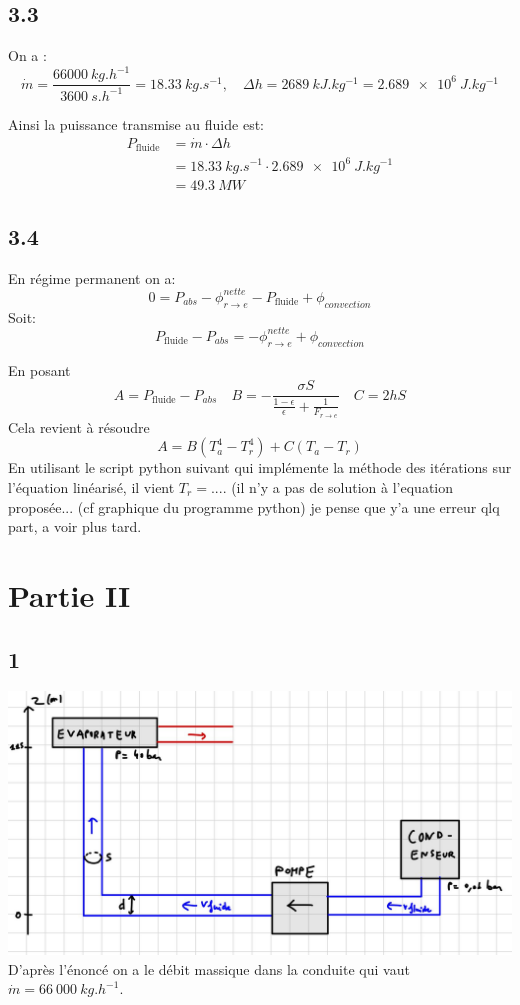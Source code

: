 \documentclass[12pt]{article}
\begin{document}
\subsection*{3.3}
On a :
\[
\dot{m} = \frac{\SI{66000}{kg.h^{-1}}}{\SI{3600}{s.h^{-1}}} = \SI{18.33}{kg.s^{-1}}, \quad
\Delta h = \SI{2689}{kJ.kg^{-1}} = \SI{2.689e6}{J.kg^{-1}}
\]

Ainsi la puissance transmise au fluide est:
\begin{align*}
P_{\text{fluide}} &= \dot{m} \cdot \Delta h \\ &= \SI{18.33}{kg.s^{-1}} \cdot \SI{2.689e6}{J.kg^{-1}} \\ &= \boxed{\SI{49.3}{MW}}
\end{align*}

\subsection*{3.4}
En régime permanent on a:
\[
0 = P_{abs} - \phi^{nette}_{r \rightarrow e} - P_{\text{fluide}} + \phi_{convection}
\]
Soit:
\[
P_{\text{fluide}} - P_{abs}  = -\phi^{nette}_{r \rightarrow e} + \phi_{convection}
\]

En posant
\[
A = P_{\text{fluide}} - P_{abs} \quad B = -\frac{\sigma S}{\frac{1-\epsilon}{\epsilon} + \frac{1}{F_{r \rightarrow e}}} \quad C = 2hS
\]
Cela revient à résoudre
\[
A = B(T_a^4 - T_r^4) + C(T_a - T_r)
\]
En utilisant le script python suivant qui implémente la méthode des itérations sur l'équation linéarisé, il vient $T_r=...$. (il n'y a pas de solution à l'equation proposée... (cf graphique du programme python) je pense que y'a une erreur qlq part, a voir plus tard.




\section*{Partie II}

\subsection*{1}
\includegraphics[scale=0.25]{2 image.jpg} \\
D'après l'énoncé on a le débit massique dans la conduite qui vaut $\dot m = 66\ 000 \ kg.h^{-1}$.
\end{document}

